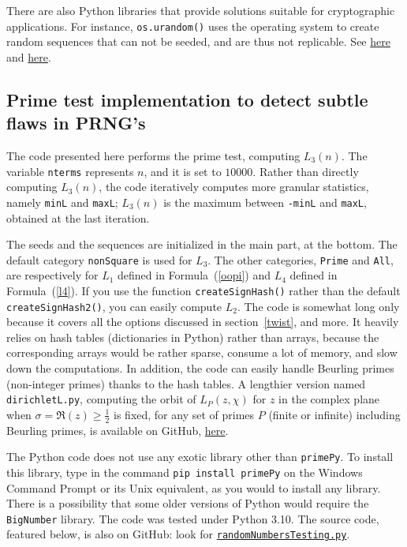 \documentclass[oneside,10pt]{book}
\begin{document}
There are also Python libraries that provide solutions suitable for cryptographic applications. For instance,
\texttt{os.urandom()}
uses the operating system to create random sequences that can not be seeded, and are thus not replicable.
See \href{https://docs.python.org/3/library/os.html#os.urandom}{here} and
\href{https://docs.python.org/3/library/secrets.html\#module-secrets}{here}.

\subsection{Prime test implementation to detect subtle flaws in PRNG's}\label{prngpython}

The code presented here performs the prime test, computing $L_3(n)$. The variable \texttt{nterms} represents $n$, and it is set to
 $\num{10000}$. Rather than directly computing $L_3(n)$, the code iteratively computes more granular statistics, namely \texttt{minL} and \texttt{maxL}; $L_3(n)$ is the maximum between \texttt{-minL} and \texttt{maxL}, obtained at the last iteration.

The seeds and the sequences are initialized in the main part, at the bottom. The default category \texttt{nonSquare} is used for $L_3$. The other categories, \texttt{Prime} and \texttt{All}, are respectively for $L_1$ defined in Formula~(\ref{oopi}) and $L_4$ defined in Formula~(\ref{l4}). If you use the function \texttt{createSignHash()} rather
than the default \texttt{createSignHash2()}, you can easily compute $L_2$. The code is somewhat long only because it covers all the options discussed
 in section~\ref{twist}, and more. It heavily relies on hash tables (dictionaries in Python) rather than arrays, because the corresponding arrays would be  rather sparse, consume a lot of memory, and slow down the computations. In addition, the code can easily handle Beurling primes (non-integer primes) thanks to the hash tables. A lengthier version named \texttt{dirichletL.py}, computing the orbit of $L_P(z,\chi)$ for $z$ in the complex plane
 when $\sigma=\Re(z)\geq \frac{1}{2}$ is fixed, for any set of primes $P$ (finite or infinite) including Beurling primes, is available on GitHub, \href{https://github.com/VincentGranville/Experimental-Math-Number-Theory/blob/main/Source-Code/dirichletL.py}{here}.

The Python code does not use any exotic library other than \texttt{primePy}.  To install this library,
 type in the command \texttt{pip install primePy} on the Windows Command Prompt or its Unix equivalent, as you would to install any library.
There is a possibility that some older versions of Python would require the \texttt{BigNumber} library. The code was tested under Python 3.10.
The source code, featured below, is also on GitHub: look for \href{https://github.com/VincentGranville/Experimental-Math-Number-Theory/blob/main/Source-Code/randomNumbersTesting.py}{\texttt{randomNumbersTesting.py}}.  \\
\end{document}
